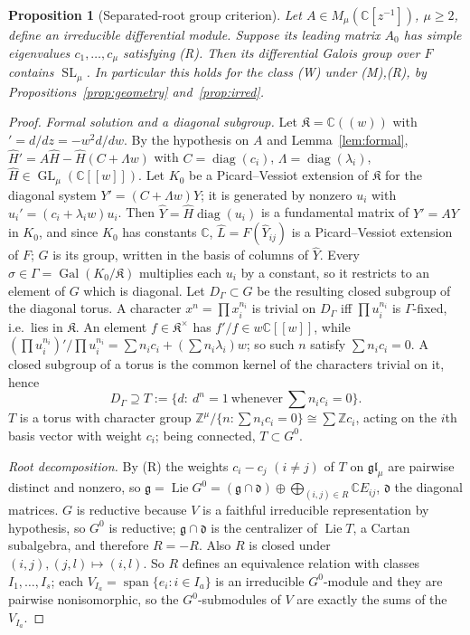 \documentclass[11pt]{article}
\numberwithin{equation}{section}
\newtheorem{proposition}[proposition]{Proposition}
\theoremstyle{definition}
\theoremstyle{remark}
\newcommand{\C}{\mathbb C}
\newcommand{\Z}{\mathbb Z}
\newcommand{\Span}{\operatorname{span}}
\newcommand{\Gal}{\operatorname{Gal}}
\newcommand{\Lie}{\operatorname{Lie}}
\newcommand{\SL}{\operatorname{SL}}
\newcommand{\GL}{\operatorname{GL}}
\begin{document}
\begin{proposition}[Separated-root group criterion]\label{prop:SL}
Let $A\in M_\mu(\C[z^{-1}])$, $\mu\ge2$, define an irreducible differential
module. Suppose its leading matrix $A_0$ has simple eigenvalues
$c_1,\ldots,c_\mu$ satisfying (R). Then its differential Galois group over
$F$ contains $\SL_\mu$. In particular this holds for the class (W) under
(M),(R), by Propositions~\ref{prop:geometry} and~\ref{prop:irred}.
\end{proposition}
\begin{proof}
\emph{Formal solution and a diagonal subgroup.} Let $\mathfrak K=\C((w))$ with
$'=d/dz=-w^2d/dw$. By the hypothesis on $A$ and Lemma~\ref{lem:formal},
$\widehat H'=A\widehat H-\widehat H(C+\Lambda w)$ with
$C=\operatorname{diag}(c_i)$, $\Lambda=\operatorname{diag}(\lambda_i)$,
$\widehat H\in\GL_\mu(\C[[w]])$. Let $K_0$ be a Picard--Vessiot extension of
$\mathfrak K$ for the diagonal system $Y'=(C+\Lambda w)Y$; it is generated by
nonzero $u_i$ with $u_i'=(c_i+\lambda_iw)u_i$. Then
$\widehat Y=\widehat H\operatorname{diag}(u_i)$ is a fundamental matrix of
$Y'=AY$ in $K_0$, and since $K_0$ has constants $\C$,
$\widehat L=F(\widehat Y_{ij})$ is a Picard--Vessiot extension of $F$; $G$ is its
group, written in the basis of columns of $\widehat Y$. Every
$\sigma\in\Gamma=\Gal(K_0/\mathfrak K)$ multiplies each $u_i$ by a constant, so
it restricts to an element of $G$ which is diagonal. Let $D_\Gamma\subset G$ be
the resulting closed subgroup of the diagonal torus. A character
$x^n=\prod x_i^{n_i}$ is trivial on $D_\Gamma$ iff $\prod u_i^{n_i}$ is
$\Gamma$-fixed, i.e.\ lies in $\mathfrak K$. An element $f\in\mathfrak K^\times$
has $f'/f\in w\C[[w]]$, while
$(\prod u_i^{n_i})'/\prod u_i^{n_i}=\sum n_ic_i+(\sum n_i\lambda_i)w$; so such
$n$ satisfy $\sum n_ic_i=0$. A closed subgroup of a torus is the common kernel
of the characters trivial on it, hence
\[
 D_\Gamma\supseteq T:=\{d:\ d^n=1\ \text{whenever}\ \textstyle\sum n_ic_i=0\}.
\]
$T$ is a torus with character group $\Z^\mu/\{n:\sum n_ic_i=0\}\cong\sum\Z c_i$,
acting on the $i$th basis vector with weight $c_i$; being connected,
$T\subset G^0$.

\emph{Root decomposition.} By (R) the weights $c_i-c_j$ $(i\ne j)$ of $T$ on
$\mathfrak{gl}_\mu$ are pairwise distinct and nonzero, so
$\mathfrak g=\Lie G^0=(\mathfrak g\cap\mathfrak d)\oplus\bigoplus_{(i,j)\in R}\C E_{ij}$,
$\mathfrak d$ the diagonal matrices. $G$ is reductive because $V$ is a faithful
irreducible representation by hypothesis, so $G^0$ is
reductive; $\mathfrak g\cap\mathfrak d$ is the centralizer of $\Lie T$, a Cartan
subalgebra, and therefore $R=-R$. Also $R$ is closed under
$(i,j),(j,l)\mapsto(i,l)$. So $R$ defines an equivalence relation with classes
$I_1,\dots,I_s$; each $V_{I_a}=\Span\{e_i:i\in I_a\}$ is an irreducible
$G^0$-module and they are pairwise nonisomorphic, so the $G^0$-submodules of
$V$ are exactly the sums of the $V_{I_a}$.


\end{proof}
\end{document}
